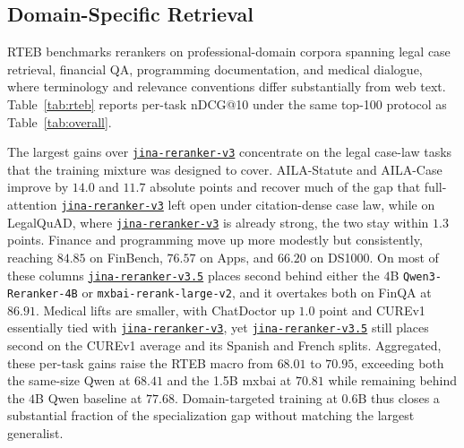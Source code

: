 \documentclass{article}
\newcommand{\jrrvthree}{\href{https://huggingface.co/jinaai/jina-reranker-v3}{\texttt{jina-reranker-v3}}}
\newcommand{\jrrvthreefive}{\href{https://huggingface.co/jinaai/jina-reranker-v3.5}{\texttt{jina-reranker-v3.5}}}
\newcommand{\qwenrankerlarge}{\texttt{Qwen3-Reranker-4B}}
\newcommand{\mxbailarge}{\texttt{mxbai-rerank-large-v2}}
\begin{document}
\subsection{Domain-Specific Retrieval}
\label{sec:rteb}

RTEB benchmarks rerankers on professional-domain corpora spanning legal case retrieval, financial QA, programming documentation, and medical dialogue, where terminology and relevance conventions differ substantially from web text. Table~\ref{tab:rteb} reports per-task nDCG@10 under the same top-100 protocol as Table~\ref{tab:overall}.

The largest gains over \jrrvthree{} concentrate on the legal case-law tasks that the training mixture was designed to cover. AILA-Statute and AILA-Case improve by $14.0$ and $11.7$ absolute points and recover much of the gap that full-attention \jrrvthree{} left open under citation-dense case law, while on LegalQuAD, where \jrrvthree{} is already strong, the two stay within $1.3$ points. Finance and programming move up more modestly but consistently, reaching $84.85$ on FinBench, $76.57$ on Apps, and $66.20$ on DS1000. On most of these columns \jrrvthreefive{} places second behind either the $4$B \qwenrankerlarge{} or \mxbailarge{}, and it overtakes both on FinQA at $86.91$. Medical lifts are smaller, with ChatDoctor up $1.0$ point and CUREv1 essentially tied with \jrrvthree{}, yet \jrrvthreefive{} still places second on the CUREv1 average and its Spanish and French splits. Aggregated, these per-task gains raise the RTEB macro from $68.01$ to $70.95$, exceeding both the same-size Qwen at $68.41$ and the 1.5B mxbai at $70.81$ while remaining behind the $4$B Qwen baseline at $77.68$. Domain-targeted training at $0.6$B thus closes a substantial fraction of the specialization gap without matching the largest generalist.
\end{document}
